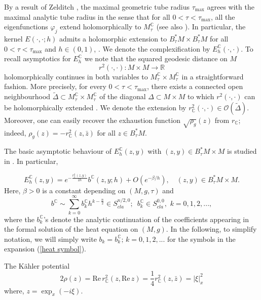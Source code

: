 \documentclass[11pt,reqno]{amsart}
\newcommand{\C}{{\mathbb C}}
\renewcommand{\Re} {\mathrm{Re\,}}
\theoremstyle{definition}
\begin{document}
By a result of Zelditch \cite[Section 11.1]{Z12}, the maximal geometric tube radius $\tau_{\max}$ agrees with the maximal analytic tube radius in the sense that for all $ 0<\tau < \tau_{\max}$, all the eigenfunctions $\varphi_j$ extend holomorphically to $M_\tau^\C$ (see also \cite[Prop. 2.1]{GLS96}). In particular, the kernel $E(\cdot,\cdot;h)$ admits a holomorphic extension to $B^*_{\tau} M \times B^*_{\tau}M$
for all $0<\tau < \tau_{\max}$  and $h \in (0,1)$, \cite[Prop. 2.4]{GLS96}. We denote the complexification by $E_h^\C( \cdot, \cdot)$.
To recall asymptotics for $E^{\C}_h$ we note that the squared geodesic distance on $M$
$$r^2(\cdot, \cdot): M \times M \to {\mathbb R}$$
holomorphically continues in both variables to $M_{\tau}^{\C} \times M_{\tau}^{\C}$ in a straightforward fashion. 
More precisely, for every $0<\tau<\tau_{\max}$, there exists a connected open neighbourhood $\tilde \Delta \subset M_\tau^\C \times M_\tau^\C$ of the diagonal $\Delta \subset M\times M$ to which $r^2(\cdot, \cdot)$ can be holomorphically extended \cite[Corollary 1.24]{GLS96}. We denote the extension
by $r_\C^2(\cdot,\cdot) \in \mathcal O(\tilde \Delta)$. Moreover, one can easily recover the exhaustion function $\sqrt{\rho_g}(z)$ from $r_{\C}$; indeed, 
$\rho_g(z)=-r^2_\C(z, \bar{z})$
for all $z \in B^*_{\tau}M$.

The basic asymptotic behaviour of $E_h^{\C}(z,y)$ with $(z,y) \in B^*_{\tau}M \times M$ is studied in \cite{GLS96}. In particular,

\begin{equation}\label{hol heat}
E_h^\C(z,y)=e^{-\frac{r^2_\C(z,y)}{2h}} b^\C(z,y; h) + O (e^{-\beta/h}), \quad (z,y) \in B_{\tau}^*M \times M.
\end{equation}
Here, $ \beta>0$ is a constant depending on $(M,g,\tau)$ and
\begin{equation} \label{heat symbol}
b^\C \sim \sum_{k=0}^{\infty} b_{k}^{\C}  h^{k - \frac{n}{2} } \in S^{n/2,0}_{cla}; \,\,\, b_k^{\C} \in S^{0,0}_{cla}, \,\, k=0,1,2,...,
\end{equation}
  where the $b_k^\C$'s denote the analytic continuation of the coefficients appearing in the formal solution
of the heat equation on $(M,g).$ In the following, to simplify notation,  we will simply write $b_k = b_k^{\C}; \, k=0,1,2,...$  for the symbols in the expansion (\ref{heat symbol}).
 \medskip
 
 


The K\"ahler potential
\begin{equation} \label{Kahler potential}
2\rho(z) =  \Re r^2_{\C}(z, \Re z) = \frac{1}{4} r_{\C}^2(z, \bar{z}) =  |\xi|_{x}^2 \end{equation}
where, $z = \exp_{x} ( -i \xi).$
\end{document}
